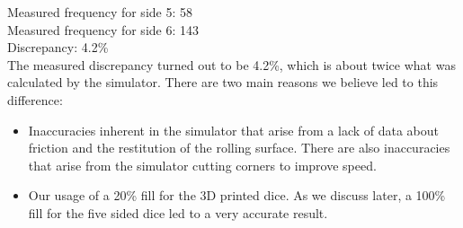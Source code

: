 Measured frequency for side 5: 58\\
Measured frequency for side 6: 143\\
Discrepancy: 4.2\%\\
The measured discrepancy turned out to be 4.2\%, which is about twice what was calculated by the simulator. There are two main reasons we believe led to this difference:\\
\begin{itemize}
    \item Inaccuracies inherent in the simulator that arise from a lack of data about friction and the restitution of the rolling surface. There are also inaccuracies that arise from the simulator cutting corners to improve speed.\\
    \item Our usage of a 20\% fill for the 3D printed dice. As we discuss later, a 100\% fill for the five sided dice led to a very accurate result.
\end{itemize}


